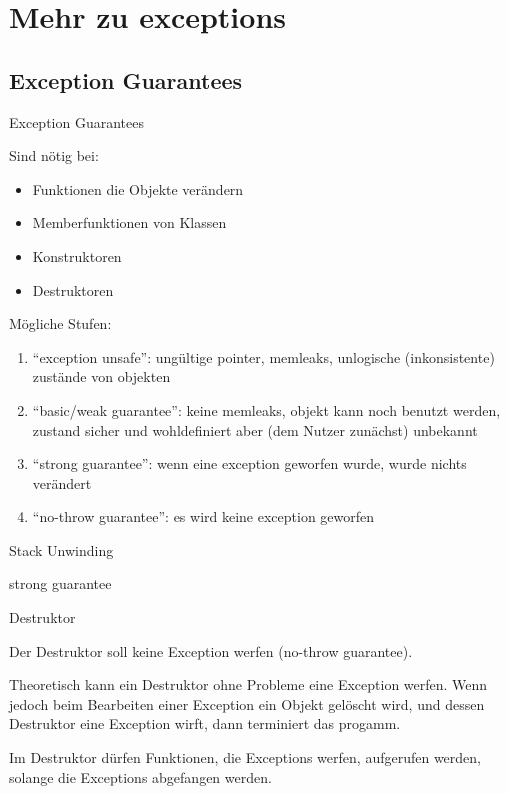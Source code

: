 \section{Mehr zu exceptions}


\subsection{Exception Guarantees}


\begin{frame}{Exception Guarantees}

    Sind nötig bei: 
	\begin{itemize}
		\item Funktionen die Objekte verändern
		\item Memberfunktionen von Klassen
		\item Konstruktoren
		\item Destruktoren
	\end{itemize}
	
	Mögliche Stufen:
	\begin{enumerate}
		\item \enquote{exception unsafe}: ungültige pointer, memleaks, unlogische (inkonsistente) zustände von objekten
		\item \enquote{basic/weak guarantee}: keine memleaks, objekt kann noch benutzt werden, zustand sicher und wohldefiniert aber (dem Nutzer zunächst) unbekannt
		\item \enquote{strong guarantee}: wenn eine exception geworfen wurde, wurde nichts verändert
		\item \enquote{no-throw guarantee}: es wird keine exception geworfen
	\end{enumerate}

\end{frame}

\begin{frame}{Stack Unwinding}
    
    

    
\end{frame}

\begin{frame}{strong guarantee}
    
    
    
\end{frame}


\begin{frame}{Destruktor}

    Der Destruktor soll keine Exception werfen (no-throw guarantee).

    Theoretisch kann ein Destruktor ohne Probleme eine Exception werfen.
    Wenn jedoch beim Bearbeiten einer Exception ein Objekt gelöscht wird, und dessen Destruktor eine Exception wirft, dann terminiert das progamm.
    
    Im Destruktor dürfen Funktionen, die Exceptions werfen, aufgerufen werden, solange die Exceptions abgefangen werden.

\end{frame}

